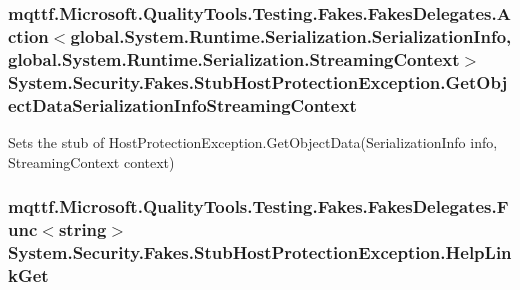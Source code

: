 \hypertarget{class_system_1_1_security_1_1_fakes_1_1_stub_host_protection_exception_a092d0f3a646eeaf6549ced2c8004647e}{
\subsubsection[{Get\-Object\-Data\-Serialization\-Info\-Streaming\-Context}]{\setlength{\rightskip}{0pt plus 5cm}mqttf.\-Microsoft.\-Quality\-Tools.\-Testing.\-Fakes.\-Fakes\-Delegates.\-Action$<$global.\-System.\-Runtime.\-Serialization.\-Serialization\-Info, global.\-System.\-Runtime.\-Serialization.\-Streaming\-Context$>$ System.\-Security.\-Fakes.\-Stub\-Host\-Protection\-Exception.\-Get\-Object\-Data\-Serialization\-Info\-Streaming\-Context}}\label{class_system_1_1_security_1_1_fakes_1_1_stub_host_protection_exception_a092d0f3a646eeaf6549ced2c8004647e}


Sets the stub of Host\-Protection\-Exception.\-Get\-Object\-Data(\-Serialization\-Info info, Streaming\-Context context)

\hypertarget{class_system_1_1_security_1_1_fakes_1_1_stub_host_protection_exception_a4f9bfb0b06a817b388b6236b9af39ea2}{
\subsubsection[{Help\-Link\-Get}]{\setlength{\rightskip}{0pt plus 5cm}mqttf.\-Microsoft.\-Quality\-Tools.\-Testing.\-Fakes.\-Fakes\-Delegates.\-Func$<$string$>$ System.\-Security.\-Fakes.\-Stub\-Host\-Protection\-Exception.\-Help\-Link\-Get}}\label{class_system_1_1_security_1_1_fakes_1_1_stub_host_protection_exception_a4f9bfb0b06a817b388b6236b9af39ea2}



